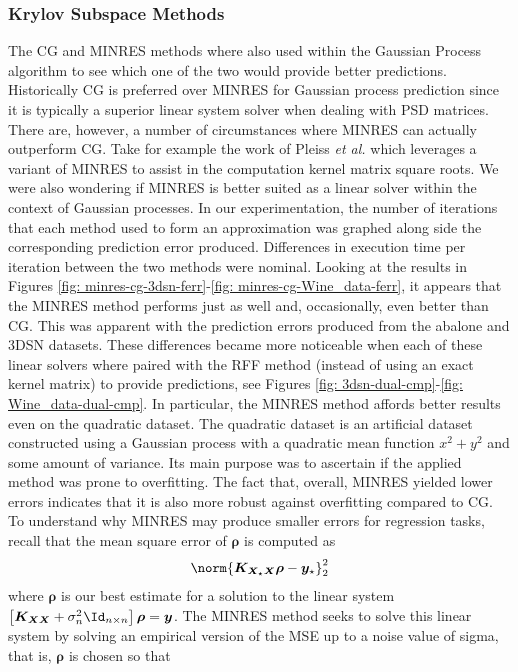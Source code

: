 \subsubsection{Krylov Subspace Methods}\label{Section5.3.2}

The CG and MINRES methods where also used within the Gaussian Process algorithm to see which one of the two would provide better predictions. Historically CG is preferred over MINRES for Gaussian process prediction since it is typically a superior linear system solver when dealing with PSD matrices. There are, however, a number of circumstances where MINRES can actually outperform CG. Take for example the work of Pleiss {\it et al.} \cite{arxiv200611267} which leverages a variant of MINRES to assist in the computation kernel matrix square roots. We were also wondering if MINRES is better suited as a linear solver within the context of Gaussian processes. In our experimentation, the number of iterations that each method used to form an approximation was graphed along side the corresponding prediction error produced. Differences in execution time per iteration between the two methods were nominal. Looking at the results in Figures \ref{fig: minres-cg-3dsn-ferr}-\ref{fig: minres-cg-Wine_data-ferr}, it appears that the MINRES method performs just as well and, occasionally, even better than CG. This was apparent with the prediction errors produced from the abalone and 3DSN datasets. These differences became more noticeable when each of these linear solvers where paired with the RFF method (instead of using an exact kernel matrix) to provide predictions, see Figures \ref{fig: 3dsn-dual-cmp}-\ref{fig: Wine_data-dual-cmp}. In particular, the MINRES method affords better results even on the quadratic dataset. The quadratic dataset is an artificial dataset constructed using a Gaussian process with a quadratic mean function $x^2 + y^2$ and some amount of variance. Its main purpose was to ascertain if the applied method was prone to overfitting. The fact that, overall, MINRES yielded lower errors indicates that it is also more robust against overfitting compared to CG. To understand why MINRES may produce smaller errors for regression tasks, recall that the mean square error of $\bm{\rho}$ is computed as
\begin{align*}
    \norm{\bm{K_{X_{\star} X}} \bm{\rho} - \bm{y}_{\star}}_2^2
\end{align*}
where $\bm{\rho}$ is our best estimate for a solution to the linear system $\left[ \bm{K_{XX}} + \sigma_n^2 \Id_{n \times n} \right] \bm{\rho} = \bm{y}$. The MINRES method seeks to solve this linear system by solving an empirical version of the MSE up to a noise value of sigma, that is, $\bm{\rho}$ is chosen so that

